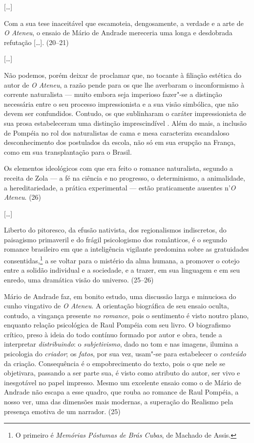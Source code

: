[\ldots]

Com a sua tese inaceitável que escamoteia, dengosamente,
a verdade e a arte de \textit{O Ateneu}, o
ensaio de Mário de Andrade mereceria uma longa e desdobrada refutação
[\ldots]. (20--21)

[\ldots]

Não podemos, porém deixar de proclamar que, no tocante à
filiação estética do autor de \textit{O Ateneu}, a razão pende para os que lhe averbaram o
inconformismo à corrente naturalista --- muito embora seja imperioso
fazer"-se a distinção necessária entre o seu processo impressionista e
a sua visão simbólica, que não devem ser confundidos. Contudo, os que
sublinharam o caráter impressionista de sua prosa estabeleceram uma
distinção imprescindível . Além do mais, a inclusão de Pompéia no rol
dos naturalistas de cama e mesa caracteriza escandaloso desconhecimento
dos postulados da escola, não só em sua erupção na França, como em sua
transplantação para o Brasil. 

Os elementos ideológicos com que era feito o romance
naturalista, segundo a receita de Zola --- a fé na ciência e no
progresso, o determinismo, a animalidade, a hereditariedade, a prática
experimental --- estão praticamente ausentes n'\textit{O Ateneu}. (26)

[\ldots]

Liberto do pitoresco, da efusão nativista, dos
regionalismos indiscretos, do paisagismo primaveril e do frágil
psicologismo dos românticos, é o segundo romance brasileiro em que a
inteligência vigilante predomina sobre as gratuidades
consentidas,\footnote{O primeiro é \textit{Memórias Póstumas de Brás
Cubas}, de Machado de Assis.} a se voltar para o
mistério da alma humana, a promover o cotejo entre a solidão individual
e a sociedade, e a trazer, em sua linguagem e em seu enredo, uma
dramática visão do universo. (25--26)  



Mário de Andrade faz, em bonito estudo, uma discussão
larga e minuciosa do cunho vingativo de \textit{O
Ateneu}. A orientação biográfica de seu ensaio oculta,
contudo, a vingança presente \textit{no
romance}, pois o sentimento é visto noutro plano,
enquanto relação psicológica de Raul Pompéia com seu livro. O
biografismo crítico, preso à ideia do todo contínuo formado por autor e
obra, tende a interpretar
\textit{distribuindo}: o
\textit{subjetivismo}, dado no tom e nas
imagens, ilumina a psicologia do
\textit{criador}; os
\textit{fatos}, por sua vez, usam"-se para
estabelecer o \textit{conteúdo} da criação.
Consequência é o empobrecimento do texto, pois o que nele se
objetivara, passando a ser parte sua, é visto como atributo do autor,
ser vivo e inesgotável no papel impresso. Mesmo um excelente ensaio
como o de Mário de Andrade não escapa a esse quadro, que rouba ao
romance de Raul Pompéia, a nosso ver, uma das dimensões mais modernas,
a superação do Realismo pela presença emotiva de um narrador. (25) 


